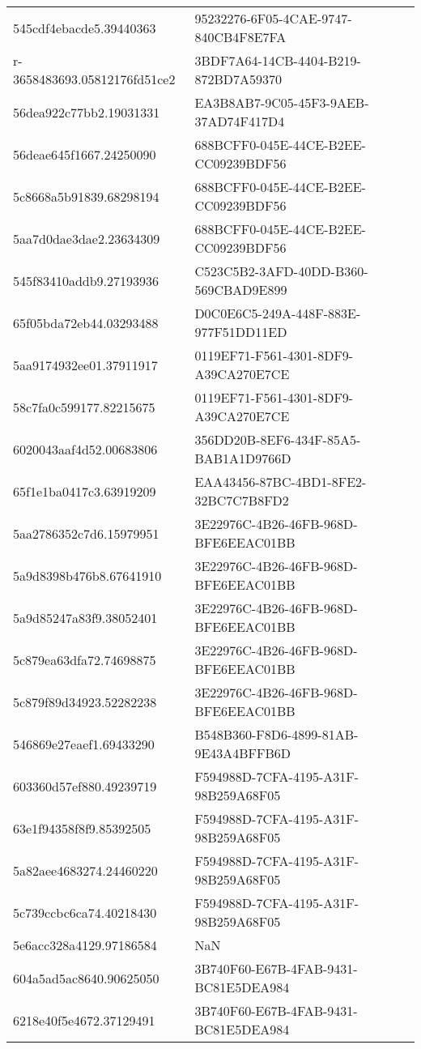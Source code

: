 \begin{tabular}{ll}
545cdf4ebacde5.39440363 & 95232276-6F05-4CAE-9747-840CB4F8E7FA \\
r-3658483693.05812176fd51ce2 & 3BDF7A64-14CB-4404-B219-872BD7A59370 \\
56dea922c77bb2.19031331 & EA3B8AB7-9C05-45F3-9AEB-37AD74F417D4 \\
56deae645f1667.24250090 & 688BCFF0-045E-44CE-B2EE-CC09239BDF56 \\
5c8668a5b91839.68298194 & 688BCFF0-045E-44CE-B2EE-CC09239BDF56 \\
5aa7d0dae3dae2.23634309 & 688BCFF0-045E-44CE-B2EE-CC09239BDF56 \\
545f83410addb9.27193936 & C523C5B2-3AFD-40DD-B360-569CBAD9E899 \\
65f05bda72eb44.03293488 & D0C0E6C5-249A-448F-883E-977F51DD11ED \\
5aa9174932ee01.37911917 & 0119EF71-F561-4301-8DF9-A39CA270E7CE \\
58c7fa0c599177.82215675 & 0119EF71-F561-4301-8DF9-A39CA270E7CE \\
6020043aaf4d52.00683806 & 356DD20B-8EF6-434F-85A5-BAB1A1D9766D \\
65f1e1ba0417c3.63919209 & EAA43456-87BC-4BD1-8FE2-32BC7C7B8FD2 \\
5aa2786352c7d6.15979951 & 3E22976C-4B26-46FB-968D-BFE6EEAC01BB \\
5a9d8398b476b8.67641910 & 3E22976C-4B26-46FB-968D-BFE6EEAC01BB \\
5a9d85247a83f9.38052401 & 3E22976C-4B26-46FB-968D-BFE6EEAC01BB \\
5c879ea63dfa72.74698875 & 3E22976C-4B26-46FB-968D-BFE6EEAC01BB \\
5c879f89d34923.52282238 & 3E22976C-4B26-46FB-968D-BFE6EEAC01BB \\
546869e27eaef1.69433290 & B548B360-F8D6-4899-81AB-9E43A4BFFB6D \\
603360d57ef880.49239719 & F594988D-7CFA-4195-A31F-98B259A68F05 \\
63e1f94358f8f9.85392505 & F594988D-7CFA-4195-A31F-98B259A68F05 \\
5a82aee4683274.24460220 & F594988D-7CFA-4195-A31F-98B259A68F05 \\
5c739ccbc6ca74.40218430 & F594988D-7CFA-4195-A31F-98B259A68F05 \\
5e6acc328a4129.97186584 & NaN \\
604a5ad5ac8640.90625050 & 3B740F60-E67B-4FAB-9431-BC81E5DEA984 \\
6218e40f5e4672.37129491 & 3B740F60-E67B-4FAB-9431-BC81E5DEA984 \\

\end{tabular}
